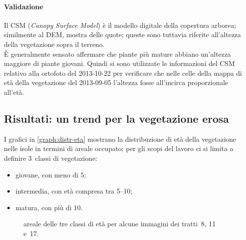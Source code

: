 \paragraph{Validazione}
Il CSM (\emph{Canopy Surface Model}) è il modello digitale della copertura arborea; similmente al DEM, mostra delle quote; queste sono tuttavia riferite all'altezza della vegetazione sopra il terreno.
\\
È generalmente sensato affermare che piante più mature abbiano un'altezza maggiore di piante giovani.
Quindi si sono utilizzate le informazioni del CSM relativo alla ortofoto del 2013-10-22 per verificare che nelle celle della mappa di età della vegetazione del 2013-09-05 l'altezza fosse all'incirca proporzionale all'età.

\subsection{Risultati: un trend per la vegetazione erosa}
I grafici in \vref{graph:distr-eta} mostrano la distribuzione di età della vegetazione nelle isole in termini di areale occupato; per gli scopi del lavoro ci si limita a definire 3~classi di vegetazione:
%
\begin{itemize}
	\item giovane, con meno di \SI{5}{\anni};
	\item intermedia, con età compresa tra \SIrange[range-phrase={ e }]{5}{10}{\anni};
	\item matura, con più di \SI{10}{\anni}.
\end{itemize}

%
\begin{figure}
	\centering
	
	\caption[areale delle classi d'età per i tratti~8, 11 e~17]{areale delle tre classi di età per alcune immagini dei tratti~8, 11 e~17.}%
	\label{graph:distr-eta}
\end{figure}
%

